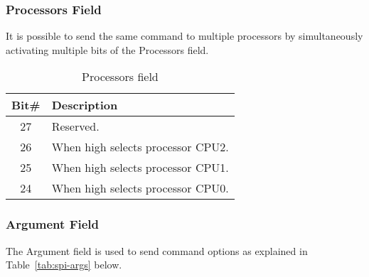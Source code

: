 \documentclass{rep}
\theoremstyle{plain}
\begin{document}
\subsubsection{Processors Field}

It is possible to send the same command to multiple processors by simultaneously
activating multiple bits of the Processors field.

\begin{table}[H]
  \begin{center}
    \begin{tabular}{|c|l|}
      \hline
      \rowcolor{iob-green}
      \textbf{Bit\#}  & \textbf{Description} \\
      \hline
      \hline

      27 & Reserved.\\ \hline

      \rowcolor{iob-blue} 26 & When high selects processor CPU2.\\ \hline

      25 & When high selects processor CPU1.\\ \hline

      \rowcolor{iob-blue} 24 & When high selects processor CPU0.\\ \hline

    \end{tabular}
    \caption{Processors field}
    \label{tab:spi-proc}
  \end{center}
\end{table}

\clearpage


\subsubsection{Argument Field}

The Argument field is used to send command options as explained in Table~\ref{tab:spi-args} below.
\end{document}

